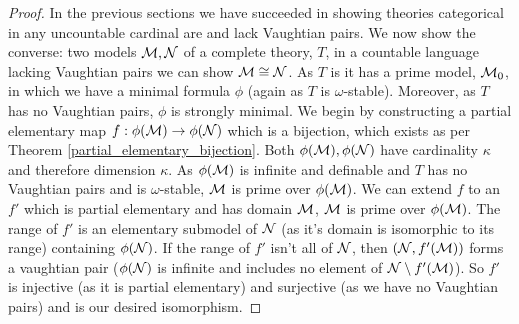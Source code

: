 \begin{proof}
In the previous sections we have succeeded in showing theories categorical in any uncountable cardinal are \omst and lack Vaughtian pairs. 
We now show the converse: two models \(\mathcal{M}, \mathcal{N}\)  of a complete \omst theory, \(T\), in a countable language lacking Vaughtian pairs we can show \(\mathcal{M} \cong \mathcal{N}\). 
As \(T\) is \omst it has a prime model, \(\mathcal{M}_0\), in which we have a minimal formula \(\phi\) (again as \(T\) is \(\omega\)-stable).
Moreover, as \(T\) has no Vaughtian pairs, \(\phi\) is strongly minimal. 
We begin by constructing a partial elementary map \(f:\phi(\mathcal{M}) \to \phi(\mathcal{N})\) which is a bijection, which exists as per Theorem \ref{partial_elementary_bijection}.
Both \(\phi(\mathcal{M}), \phi(\mathcal{N})\) have cardinality \(\kappa\) and therefore dimension \(\kappa\). 
As \(\phi(\mathcal{M})\) is infinite and definable and \(T\) has no Vaughtian pairs and is \(\omega\)-stable, \(\mathcal{M}\) is prime over \(\phi(\mathcal{M})\).
We can extend \(f\) to an \(f'\) which is partial elementary and has domain \(\mathcal{M}\), \(\mathcal{M}\) is prime over \(\phi(\mathcal{M})\).
The range of \(f'\) is an elementary submodel of \(\mathcal{N}\) (as it's domain is isomorphic to its range) containing \(\phi(\mathcal{N})\). 
If the range of \(f'\) isn't all of \(\mathcal{N}\), then \((\mathcal{N}, f'(\mathcal{M}))\) forms a vaughtian pair (\(\phi(\mathcal{N})\) is infinite and includes no element of \(\mathcal{N} \setminus f'(\mathcal{M})\)).  
So \(f'\) is injective (as it is partial elementary) and surjective (as we have no Vaughtian pairs) and is our desired isomorphism. 
\end{proof}

